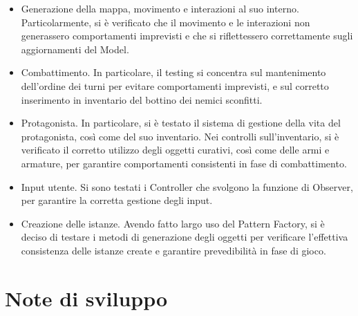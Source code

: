 \documentclass[a4paper,12pt]{report}
\begin{document}
\begin{itemize}
	\item Generazione della mappa, movimento e interazioni al suo interno. Particolarmente, si è verificato che il movimento e le interazioni non generassero comportamenti imprevisti e che si riflettessero correttamente sugli aggiornamenti del Model.
	\item Combattimento. In particolare, il testing si concentra sul mantenimento dell’ordine dei turni per evitare comportamenti imprevisti, e sul corretto inserimento in inventario del bottino dei nemici sconfitti.
	\item Protagonista. In particolare, si è testato il sistema di gestione della vita del protagonista, così come del suo inventario. Nei controlli sull’inventario, si è verificato il corretto utilizzo degli oggetti curativi, così come delle armi e armature, per garantire comportamenti consistenti in fase di combattimento.
	\item Input utente. Si sono testati i Controller che svolgono la funzione di Observer, per garantire la corretta gestione degli input.
	\item Creazione delle istanze. Avendo fatto largo uso del Pattern Factory, si è deciso di testare i metodi di generazione degli oggetti per verificare l’effettiva consistenza delle istanze create e garantire prevedibilità in fase di gioco.
\end{itemize}

\section{Note di sviluppo}
\end{document}
